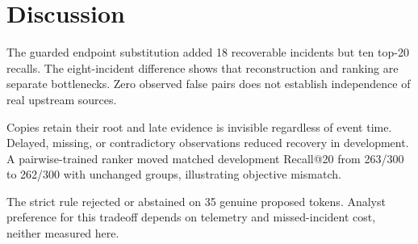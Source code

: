 \section{Discussion}
The guarded endpoint substitution added 18 recoverable incidents but ten top-20 recalls. The eight-incident difference shows that reconstruction and ranking are separate bottlenecks. Zero observed false pairs does not establish independence of real upstream sources.

Copies retain their root and late evidence is invisible regardless of event time. Delayed, missing, or contradictory observations reduced recovery in development. A pairwise-trained ranker moved matched development Recall@20 from 263/300 to 262/300 with unchanged groups, illustrating objective mismatch.

The strict rule rejected or abstained on 35 genuine proposed tokens. Analyst preference for this tradeoff depends on telemetry and missed-incident cost, neither measured here.

